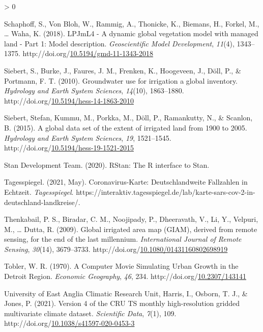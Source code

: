 \documentclass[12pt,twoside]{reedthesis}
\newlength{\cslhangindent}
\newenvironment{CSLReferences}[2] %
 {%
  \setlength{\parindent}{0pt}
  \ifodd #1 \everypar{\setlength{\hangindent}{\cslhangindent}}\ignorespaces\fi
  \ifnum #2 > 0
  \setlength{\parskip}{#2\baselineskip}
  \fi
 }%
 {}
\begin{document}
\begin{CSLReferences}{1}{0}
\leavevmode\hypertarget{ref-schaphoffLPJmL4DynamicGlobal2018}{}%
Schaphoff, S., Von Bloh, W., Rammig, A., Thonicke, K., Biemans, H., Forkel, M., \ldots{} Waha, K. (2018). {LPJmL4} - {A} dynamic global vegetation model with managed land - {Part} 1: Model description. \emph{Geoscientific Model Development}, \emph{11}(4), 1343--1375. http://doi.org/\href{https://doi.org/10.5194/gmd-11-1343-2018}{10.5194/gmd-11-1343-2018}

\leavevmode\hypertarget{ref-siebertGroundwaterUseIrrigation2010}{}%
Siebert, S., Burke, J., Faures, J. M., Frenken, K., Hoogeveen, J., Döll, P., \& Portmann, F. T. (2010). Groundwater use for irrigation {} a global inventory. \emph{Hydrology and Earth System Sciences}, \emph{14}(10), 1863--1880. http://doi.org/\href{https://doi.org/10.5194/hess-14-1863-2010}{10.5194/hess-14-1863-2010}

\leavevmode\hypertarget{ref-siebertGlobalDataSet2015}{}%
Siebert, Stefan, Kummu, M., Porkka, M., Döll, P., Ramankutty, N., \& Scanlon, B. (2015). A global data set of the extent of irrigated land from 1900 to 2005. \emph{Hydrology and Earth System Sciences}, \emph{19}, 1521--1545. http://doi.org/\href{https://doi.org/10.5194/hess-19-1521-2015}{10.5194/hess-19-1521-2015}

\leavevmode\hypertarget{ref-standevelopmentteamRStanInterfaceStan2020}{}%
Stan Development Team. (2020). {RStan}: The {R} interface to {Stan}.

\leavevmode\hypertarget{ref-tagesspiegelCoronavirusKarteDeutschlandweiteFallzahlen2021}{}%
Tagesspiegel. (2021, May). Coronavirus-{Karte}: Deutschlandweite {Fallzahlen} in {Echtzeit}. \emph{Tagesspiegel}. https://interaktiv.tagesspiegel.de/lab/karte-sars-cov-2-in-deutschland-landkreise/.

\leavevmode\hypertarget{ref-thenkabailGlobalIrrigatedArea2009}{}%
Thenkabail, P. S., Biradar, C. M., Noojipady, P., Dheeravath, V., Li, Y., Velpuri, M., \ldots{} Dutta, R. (2009). Global irrigated area map ({GIAM}), derived from remote sensing, for the end of the last millennium. \emph{International Journal of Remote Sensing}, \emph{30}(14), 3679--3733. http://doi.org/\href{https://doi.org/10.1080/01431160802698919}{10.1080/01431160802698919}

\leavevmode\hypertarget{ref-toblerComputerMovieSimulating1970}{}%
Tobler, W. R. (1970). A {Computer Movie Simulating Urban Growth} in the {Detroit Region}. \emph{Economic Geography}, \emph{46}, 234. http://doi.org/\href{https://doi.org/10.2307/143141}{10.2307/143141}

\leavevmode\hypertarget{ref-universityofeastangliaclimaticresearchunitVersionCRUTS2021}{}%
University of East Anglia Climatic Research Unit, Harris, I., Osborn, T. J., \& Jones, P. (2021). Version 4 of the {CRU TS} monthly high-resolution gridded multivariate climate dataset. \emph{Scientific Data}, \emph{7}(1), 109. http://doi.org/\href{https://doi.org/10.1038/s41597-020-0453-3}{10.1038/s41597-020-0453-3}

\end{CSLReferences}

\end{document}
